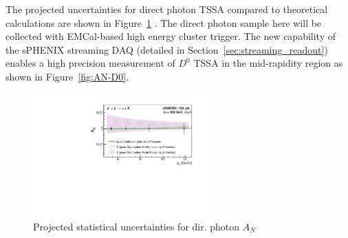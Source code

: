The projected uncertainties for direct photon TSSA compared to theoretical calculations are shown in Figure~\ref{fig:AN_dp} . The direct photon sample here will be collected with EMCal-based high energy cluster trigger. 
The new capability of the sPHENIX streaming DAQ (detailed in Section~\ref{sec:streaming_readout}) enables a high precision measurement of $D^0$ TSSA in the mid-rapidity region as shown in Figure~\ref{fig:AN-D0}. 
\begin{figure}[htbp]
\centering
\includegraphics[width=0.60\textwidth]{figs/AN_dp_sphenix.pdf}
\caption{Projected statistical uncertainties for dir. photon $A_N$}
\label{fig:AN_dp}
\end{figure}

